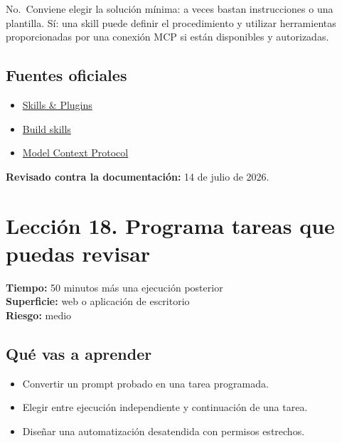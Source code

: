 \documentclass[10pt,a4paper,openany]{book}
\providecommand{\tightlist}{\setlength{\itemsep}{0.18em}\setlength{\parskip}{0pt}}
\begin{document}
No.~Conviene elegir la solución mínima: a veces bastan instrucciones o
una plantilla. Sí: una skill puede definir el procedimiento y utilizar
herramientas proporcionadas por una conexión MCP si están disponibles y
autorizadas.

\subsection{Fuentes oficiales}\label{fuentes-oficiales-16}

\begin{itemize}
\tightlist
\item
  \href{https://learn.chatgpt.com/docs/skills-and-plugins}{Skills \&
  Plugins}
\item
  \href{https://learn.chatgpt.com/docs/build-skills}{Build skills}
\item
  \href{https://learn.chatgpt.com/docs/extend/mcp}{Model Context
  Protocol}
\end{itemize}

\textbf{Revisado contra la documentación:} 14 de julio de 2026.

\clearpage

\section{Lección 18. Programa tareas que puedas
revisar}\label{lecciuxf3n-18.-programa-tareas-que-puedas-revisar}

\begin{metabox}

\textbf{Tiempo:} 50 minutos más una ejecución posterior\\
\textbf{Superficie:} web o aplicación de escritorio\\
\textbf{Riesgo:} medio

\end{metabox}

\subsection{Qué vas a aprender}\label{quuxe9-vas-a-aprender-17}

\begin{itemize}
\tightlist
\item
  Convertir un prompt probado en una tarea programada.
\item
  Elegir entre ejecución independiente y continuación de una tarea.
\item
  Diseñar una automatización desatendida con permisos estrechos.
\end{itemize}
\end{document}
